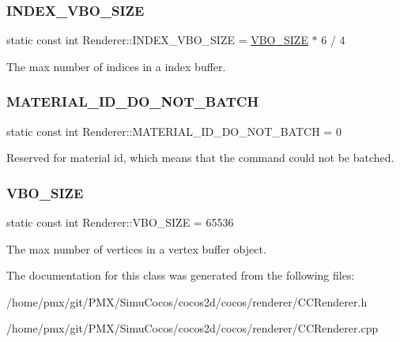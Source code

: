 \subsubsection{\texorpdfstring{I\+N\+D\+E\+X\+\_\+\+V\+B\+O\+\_\+\+S\+I\+ZE}{INDEX\_VBO\_SIZE}}
{\footnotesize\ttfamily static const int Renderer\+::\+I\+N\+D\+E\+X\+\_\+\+V\+B\+O\+\_\+\+S\+I\+ZE = \hyperlink{classRenderer_adf68e0f4b14d92f2e8f357f44c52dd1d}{V\+B\+O\+\_\+\+S\+I\+ZE} $\ast$ 6 / 4\hspace{0.3cm}{\ttfamily [static]}}

The max number of indices in a index buffer. \mbox{\label{classRenderer_a78627bb9847d4b1f2be7b8cdc3137572}} 
\subsubsection{\texorpdfstring{M\+A\+T\+E\+R\+I\+A\+L\+\_\+\+I\+D\+\_\+\+D\+O\+\_\+\+N\+O\+T\+\_\+\+B\+A\+T\+CH}{MATERIAL\_ID\_DO\_NOT\_BATCH}}
{\footnotesize\ttfamily static const int Renderer\+::\+M\+A\+T\+E\+R\+I\+A\+L\+\_\+\+I\+D\+\_\+\+D\+O\+\_\+\+N\+O\+T\+\_\+\+B\+A\+T\+CH = 0\hspace{0.3cm}{\ttfamily [static]}}

Reserved for material id, which means that the command could not be batched. \mbox{\label{classRenderer_adf68e0f4b14d92f2e8f357f44c52dd1d}} 
\subsubsection{\texorpdfstring{V\+B\+O\+\_\+\+S\+I\+ZE}{VBO\_SIZE}}
{\footnotesize\ttfamily static const int Renderer\+::\+V\+B\+O\+\_\+\+S\+I\+ZE = 65536\hspace{0.3cm}{\ttfamily [static]}}

The max number of vertices in a vertex buffer object. 

The documentation for this class was generated from the following files\+:\begin{DoxyCompactItemize}
\item 
/home/pmx/git/\+P\+M\+X/\+Simu\+Cocos/cocos2d/cocos/renderer/C\+C\+Renderer.\+h\item 
/home/pmx/git/\+P\+M\+X/\+Simu\+Cocos/cocos2d/cocos/renderer/C\+C\+Renderer.\+cpp\end{DoxyCompactItemize}
